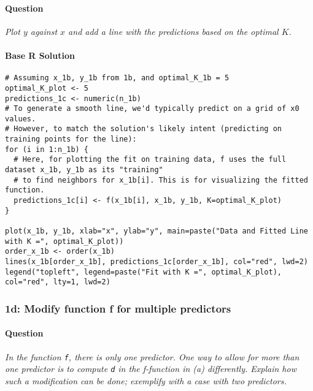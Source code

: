 \documentclass[12pt,a4paper]{article}
\newcommand{\Rcode}[1]{\texttt{#1}} %
\begin{document}
        \paragraph{Question}
        \textit{Plot $y$ against $x$ and add a line with the predictions based on the optimal $K$.}
        \paragraph{Base R Solution}
\begin{lstlisting}
# Assuming x_1b, y_1b from 1b, and optimal_K_1b = 5
optimal_K_plot <- 5 
predictions_1c <- numeric(n_1b)
# To generate a smooth line, we'd typically predict on a grid of x0 values.
# However, to match the solution's likely intent (predicting on training points for the line):
for (i in 1:n_1b) {
  # Here, for plotting the fit on training data, f uses the full dataset x_1b, y_1b as its "training"
  # to find neighbors for x_1b[i]. This is for visualizing the fitted function.
  predictions_1c[i] <- f(x_1b[i], x_1b, y_1b, K=optimal_K_plot)
}

plot(x_1b, y_1b, xlab="x", ylab="y", main=paste("Data and Fitted Line with K =", optimal_K_plot))
order_x_1b <- order(x_1b)
lines(x_1b[order_x_1b], predictions_1c[order_x_1b], col="red", lwd=2)
legend("topleft", legend=paste("Fit with K =", optimal_K_plot), col="red", lty=1, lwd=2)
\end{lstlisting}

    \subsubsection{1d: Modify function f for multiple predictors}
        \paragraph{Question}
        \textit{In the function \Rcode{f}, there is only one predictor. One way to allow for more than one predictor is to compute \Rcode{d} in the f-function in (a) differently. Explain how such a modification can be done; exemplify with a case with two predictors.}
\end{document}

